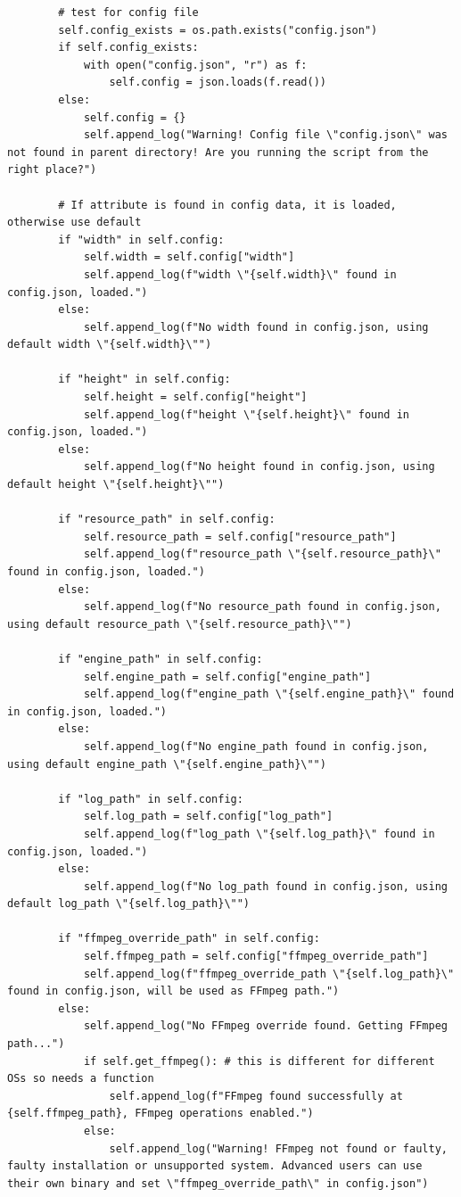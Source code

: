 \documentclass{report}
\begin{document}
\begin{verbatim}
        # test for config file
        self.config_exists = os.path.exists("config.json")
        if self.config_exists:
            with open("config.json", "r") as f:
                self.config = json.loads(f.read())
        else:
            self.config = {}
            self.append_log("Warning! Config file \"config.json\" was not found in parent directory! Are you running the script from the right place?")
        
        # If attribute is found in config data, it is loaded, otherwise use default
        if "width" in self.config:
            self.width = self.config["width"]
            self.append_log(f"width \"{self.width}\" found in config.json, loaded.")
        else:
            self.append_log(f"No width found in config.json, using default width \"{self.width}\"")

        if "height" in self.config:
            self.height = self.config["height"]
            self.append_log(f"height \"{self.height}\" found in config.json, loaded.")
        else:
            self.append_log(f"No height found in config.json, using default height \"{self.height}\"")

        if "resource_path" in self.config:
            self.resource_path = self.config["resource_path"]
            self.append_log(f"resource_path \"{self.resource_path}\" found in config.json, loaded.")
        else:
            self.append_log(f"No resource_path found in config.json, using default resource_path \"{self.resource_path}\"")

        if "engine_path" in self.config:
            self.engine_path = self.config["engine_path"]
            self.append_log(f"engine_path \"{self.engine_path}\" found in config.json, loaded.")
        else:
            self.append_log(f"No engine_path found in config.json, using default engine_path \"{self.engine_path}\"")

        if "log_path" in self.config:
            self.log_path = self.config["log_path"]
            self.append_log(f"log_path \"{self.log_path}\" found in config.json, loaded.")
        else:
            self.append_log(f"No log_path found in config.json, using default log_path \"{self.log_path}\"")

        if "ffmpeg_override_path" in self.config:
            self.ffmpeg_path = self.config["ffmpeg_override_path"]
            self.append_log(f"ffmpeg_override_path \"{self.log_path}\" found in config.json, will be used as FFmpeg path.")
        else:
            self.append_log("No FFmpeg override found. Getting FFmpeg path...")
            if self.get_ffmpeg(): # this is different for different OSs so needs a function
                self.append_log(f"FFmpeg found successfully at {self.ffmpeg_path}, FFmpeg operations enabled.")
            else:
                self.append_log("Warning! FFmpeg not found or faulty, faulty installation or unsupported system. Advanced users can use their own binary and set \"ffmpeg_override_path\" in config.json")


\end{verbatim}
\end{document}
